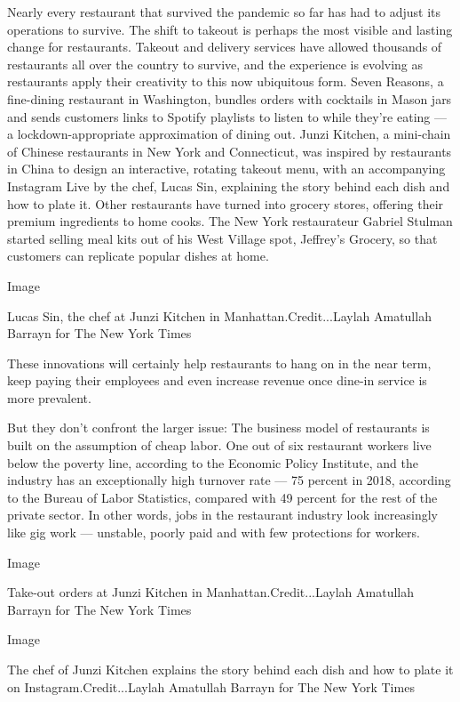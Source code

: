 Nearly every restaurant that survived the pandemic so far has had to
adjust its operations to survive. The shift to takeout is perhaps the
most visible and lasting change for restaurants. Takeout and delivery
services have allowed thousands of restaurants all over the country to
survive, and the experience is evolving as restaurants apply their
creativity to this now ubiquitous form. Seven Reasons, a fine-dining
restaurant in Washington, bundles orders with cocktails in Mason jars
and sends customers links to Spotify playlists to listen to while
they're eating --- a lockdown-appropriate approximation of dining out.
Junzi Kitchen, a mini-chain of Chinese restaurants in New York and
Connecticut, was inspired by restaurants in China to design an
interactive, rotating takeout menu, with an accompanying Instagram Live
by the chef, Lucas Sin, explaining the story behind each dish and how to
plate it. Other restaurants have turned into grocery stores, offering
their premium ingredients to home cooks. The New York restaurateur
Gabriel Stulman started selling meal kits out of his West Village spot,
Jeffrey's Grocery, so that customers can replicate popular dishes at
home.

Image

Lucas Sin, the chef at Junzi Kitchen in Manhattan.Credit...Laylah
Amatullah Barrayn for The New York Times

These innovations will certainly help restaurants to hang on in the near
term, keep paying their employees and even increase revenue once dine-in
service is more prevalent.

But they don't confront the larger issue: The business model of
restaurants is built on the assumption of cheap labor. One out of six
restaurant workers live below the poverty line, according to the
Economic Policy Institute, and the industry has an exceptionally high
turnover rate --- 75 percent in 2018, according to the Bureau of Labor
Statistics, compared with 49 percent for the rest of the private sector.
In other words, jobs in the restaurant industry look increasingly like
gig work --- unstable, poorly paid and with few protections for workers.

Image

Take-out orders at Junzi Kitchen in Manhattan.Credit...Laylah Amatullah
Barrayn for The New York Times

Image

The chef of Junzi Kitchen explains the story behind each dish and how to
plate it on Instagram.Credit...Laylah Amatullah Barrayn for The New York
Times

